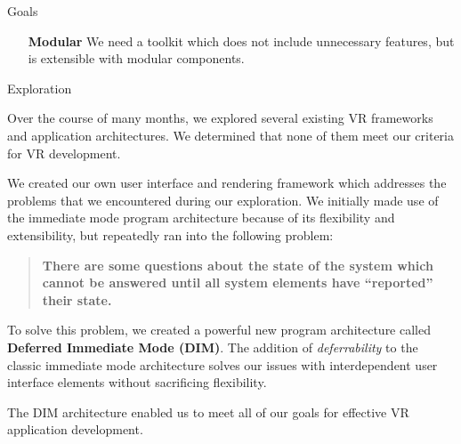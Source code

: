 \documentclass[final]{beamer}
\newlength{\onecolwid}
\begin{document}
\begin{frame}[t]
\begin{columns}[t]
\begin{column}{\onecolwid}
\begin{block}{Goals}
\begin{enumerate}[leftmargin=8.75cm, labelsep=1cm]
                        \item[\textbf{Modular}] We need a toolkit which does
                            not include unnecessary features, but is extensible
                            with modular components.

                    \end{enumerate}

                \end{block}

                \begin{block}{Exploration}

                    Over the course of many months, we explored several existing
                    VR frameworks and application architectures. We determined
                    that none of them meet our criteria for VR development.

                    We created our own user interface and rendering framework
                    which addresses the problems that we encountered during our
                    exploration. We initially made use of the immediate mode
                    program architecture because of its flexibility and
                    extensibility, but repeatedly ran into the following
                    problem:

                    \begin{quote}

                        \textbf{There are some questions about the state of the
                        system which cannot be answered until all system
                        elements have ``reported'' their state.}

                    \end{quote}

                    To solve this problem, we created a powerful new program
                    architecture called \textbf{Deferred Immediate Mode (DIM)}.
                    The addition of \textit{deferrability} to the classic
                    immediate mode architecture solves our issues with
                    interdependent user interface elements without sacrificing
                    flexibility.

                    The DIM architecture enabled us to meet all of our goals for
                    effective VR application development.

                \end{block}

            \end{column} %


\end{columns}
\end{frame}
\end{document}

